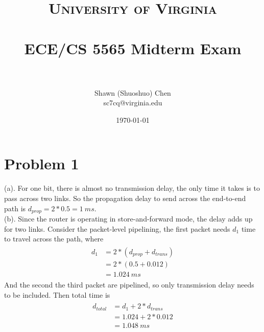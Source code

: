 \documentclass[titlepage, paper=a4, fontsize=11pt]{scrartcl} %
\title{	
\normalfont \normalsize 
\textsc{University of Virginia} \\ [25pt] %
\horrule{0.5pt} \\[0.4cm] %
\huge ECE/CS 5565 Midterm Exam \\ %
\horrule{2pt} \\[0.5cm] %
}
\author{Shawn (Shuoshuo) Chen\\sc7cq@virginia.edu} %
\date{\normalsize\today} %
\numberwithin{equation}{section} %
\numberwithin{table}{section} %
\begin{document}
\maketitle %


\section*{Problem 1}
(a).
For one bit, there is almost no transmission delay, the only time it takes is to pass across two links.
So the propagation delay to send across the end-to-end path is $d_{prop}=2*0.5=1\ ms$. \\

(b).
Since the router is operating in store-and-forward mode, the delay adds up for two links. Consider the packet-level pipelining, the first packet needs $d_1$ time to travel across the path, where
\begin{align*} 
\begin{split}
d_1 &= 2*(d_{prop} + d_{trans}) \\
&= 2*(0.5 + 0.012) \\
&= 1.024 \ ms
\end{split}					
\end{align*}
And the second the third packet are pipelined, so only transmission delay needs to be included. Then total time is
\begin{align*} 
\begin{split}
d_{total} &= d_1 + 2*d_{trans} \\
&= 1.024 + 2*0.012 \\
&= 1.048 \ ms
\end{split}					
\end{align*}
\\


\end{document}
